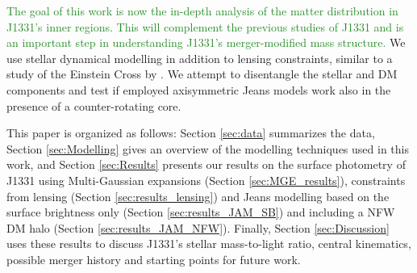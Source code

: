 \documentclass[useAMS,usenatbib]{mnras}
\newcommand{\NEW}[1]{\textcolor{ForestGreen}{#1}}
\newcommand{\OLD}[1]{}
\begin{document}
\OLD{The goal of this work is to complement the previous studies of J1331 by an in-depth analysis of the matter distribution in J1331's inner regions.}\NEW{The goal of this work is now the in-depth analysis of the matter distribution in J1331's inner regions. This will complement the previous studies of J1331 and is an important step in understanding J1331's merger-modified mass structure.} We use stellar dynamical modelling in addition to lensing constraints, similar to a study of the Einstein Cross by \citet{GlennEC}. We attempt to disentangle the stellar and DM components and test if employed axisymmetric Jeans models work also in the presence of a counter-rotating core. \OLD{Ideally, this work on J1331 could also help understanding how mergers modify the mass distribution of a galaxy.}

This paper is organized as follows: Section \ref{sec:data} summarizes the data, Section \ref{sec:Modelling} gives an overview of the modelling techniques used in this work, and Section \ref{sec:Results} presents our results on the surface photometry of J1331 using Multi-Gaussian expansions (Section \ref{sec:MGE_results}), constraints from lensing (Section \ref{sec:results_lensing}) and Jeans modelling based on the surface brightness only (Section \ref{sec:results_JAM_SB}) and including a NFW DM halo (Section \ref{sec:results_JAM_NFW}). Finally, Section \ref{sec:Discussion} uses these results to discuss J1331's stellar mass-to-light ratio, central kinematics, possible merger history and starting points for future work.
\end{document}
